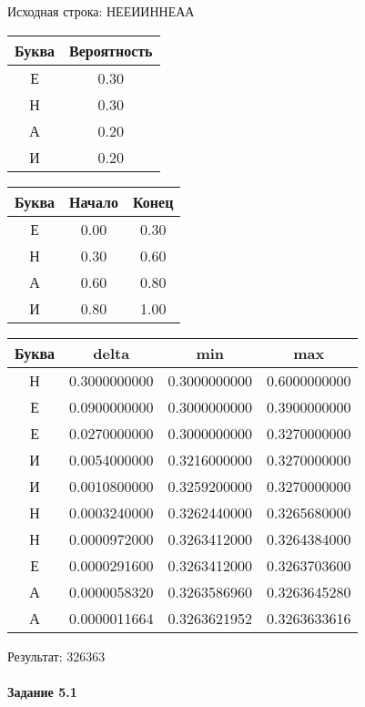\documentclass[a4paper, 12pt]{article}
\begin{document}
Исходная строка: НЕЕИИННЕАА\
\begin{center}
 \begin{tabular}{ |c|c| } 
  \hline
     Буква & Вероятность \\ \hline
Е & 0.30\\\hline
Н & 0.30\\\hline
А & 0.20\\\hline
И & 0.20
\\ \hline \end{tabular}
\end{center}
\begin{center}
 \begin{tabular}{ |c|c|c| } 
  \hline
     Буква & Начало & Конец \\ \hline
Е & 0.00 & 0.30\\\hline
Н & 0.30 & 0.60\\\hline
А & 0.60 & 0.80\\\hline
И & 0.80 & 1.00
\\ \hline \end{tabular}
\end{center}
\begin{center}
 \begin{tabular}{ |c|c|c|c| } 
  \hline
     Буква & delta & min & max \\ \hline
Н & 0.3000000000 & 0.3000000000 & 0.6000000000\\\hline
Е & 0.0900000000 & 0.3000000000 & 0.3900000000\\\hline
Е & 0.0270000000 & 0.3000000000 & 0.3270000000\\\hline
И & 0.0054000000 & 0.3216000000 & 0.3270000000\\\hline
И & 0.0010800000 & 0.3259200000 & 0.3270000000\\\hline
Н & 0.0003240000 & 0.3262440000 & 0.3265680000\\\hline
Н & 0.0000972000 & 0.3263412000 & 0.3264384000\\\hline
Е & 0.0000291600 & 0.3263412000 & 0.3263703600\\\hline
А & 0.0000058320 & 0.3263586960 & 0.3263645280\\\hline
А & 0.0000011664 & 0.3263621952 & 0.3263633616
\\ \hline \end{tabular}
\end{center}
Результат: 326363
\pagebreak
\paragraph{Задание 5.1 \\
}
\end{document}

